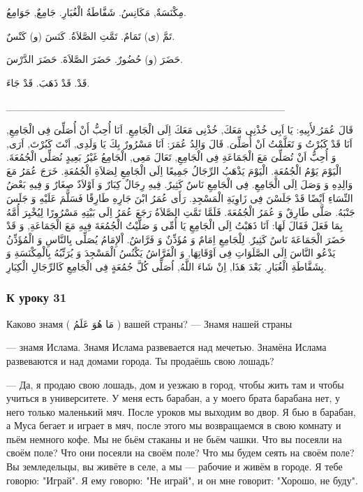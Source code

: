 \documentclass[a5paper]{article}
\begin{document}
مِكْنَسَةٌ, مَكَانِسُ. شَفَّاطَةُ الْغُبَارِ. جَامِعٌ, جَوَامِعُ. 

تَمَّ (ى) تَمَامٌ. تَمَّتِ الصَّلاَةُ. كَنَسَ (و) كَنْسٌ. 

حَضَرَ (و) حُضُورٌ. حَضَرَ الصَّلاَةَ. حَضَرَ الدَّرْسَ. 

قَدْ. قَدْ ذَهَبَ. قَدْ جَاءَ.

\_\_\_\_\_\_\_\_\_\_\_\_\_\_\_\_\_\_\_\_\_\_\_\_\_\_\_\_\_\_\_\_\_\_\_\_\_\_

قَالَ عُمَرُ ِلأَبِيهِ: يَا اَبِى خُذْنِى مَعَكَ, خُذْنِى مَعَكَ اِلَى الْجَامِعِ. اَنَا أُحِبُّ أَنْ أُصَلِّىَ فِى الْجَامِعِ, اَنَا قَدْ كَبُرْتُ وَ تَعَلَّمْتُ اَنْ أُصَلِّىَ. قَالَ وَالِدُ عُمَرَ: اَنَا مَسْرُورٌ بِكَ يَا وَلَدِى, اَنْتَ كَبُرْتَ, اَرَى, وَ أُحِبُّ اَنْ تُصَلِّىَ مَعَ الْجَمَاعَةِ فِى الْجَامِعِ, تَعَالَ مَعِى, الْجَامِعُ غَيْرُ بَعِيدٍ نُصَلِّى الْجُمُعَةَ. الْيَوْمَ يَوْمُ الْجُمُعَةِ. الْيَوْمَ يَذْهَبُ الرِّجَالُ جَمِيعًا اِلَى الْجَامِعِ لِصَلاَةِ الْجُمُعَةِ. خَرَجَ عُمَرُ مَعَ وَالِدِهِ وَ وَصَلَ اِلَى الْجَامِعِ. فِى الْجَامِعِ نَاسٌ كَثِيرٌ. فِيهِ رِجَالٌ كِبَارٌ وَ اَوْلاَدٌ صِغَارٌ وَ فِيهِ بَعْضُ النِّسَاءِ اَيْضًا قَدْ جَلَسْنَ فِى زَاوِيَةِ الْمَسْجِدِ. رَأَى عُمَرُ ابْنَ جَارِهِ طَارِقًا فَسَلَّمَ عَلَيْهِ وَ جَلَسَ جَنْبَهُ. صَلَّى طَارِقٌ وَ عُمَرُ الْجُمُعَةَ. فَلَمَّا تَمَّتِ الصَّلاَةُ رَجَعَ عُمَرُ اِلَى بَيْتِهِ مَسْرُورًا لِيُخْبِرَ أُمَّهُ بِمَا فَعَلَ فَقَالَ لَهَا: اَنَا ذَهَبْتُ اِلَى الْجَامِعِ يَا أُمِّى وَ صَلَّيْتُ الْجُمُعَةَ فِيهِ مَعَ الْجَمَاعَةِ, وَ قَدْ حَضَرَ الْجَمَاعَةَ نَاسٌ كَثِيرٌ. لِلْجَامِعِ اِمَامٌ وَ مُؤَذِّنٌ وَ فَرَّاشٌ. اْلإِمَامُ يُصَلِّى بِالنَّاسِ وَ الْمُؤَذِّنُ يَدْعُو النَّاسَ اِلَى الصَّلَوَاتِ فِى اَوْقَاتِهَا, وَ الْفَرَّاشُ يَكْنُسُ الْمَسْجِدَ وَ يُرَتِّبُهُ بِالْمِكْنَسَةِ وَ بِشَفَّاطَةِ الْغُبَارِ. بَعْدَ هَذَا, اِنْ شَاءَ اللَّهُ, اُصَلِّى كُلَّ جُمُعَةٍ فِى الْجَامِعِ كَالرِّجَالِ الْكِبَارِ.

\subsubsection[К уроку 31]{К уроку 31}
Каково знамя ( مَا هُوَ عَلَمُ ) вашей страны? — Знамя нашей страны

— знамя Ислама. Знамя Ислама развевается над мечетью. Знамёна Ислама развеваются и над домами города. Ты продаёшь свою лошадь?

— Да, я продаю свою лошадь, дом и уезжаю в город, чтобы жить там и чтобы учиться в университете. У меня есть барабан, а у моего брата барабана нет, у него только маленький мяч. После уроков мы выходим во двор. Я бью в барабан, а Муса бегает и играет в мяч, после этого мы возвращаемся в свою комнату и пьём немного кофе. Мы не бьём стаканы и не бьём чашки. Что вы посеяли на своём поле? Что они посеяли на своём поле? Что мы будем сеять на своём поле? Вы земледельцы, вы живёте в селе, а мы — рабочие и живём в городе. Я тебе говорю: "Играй". Я ему говорю: "Не играй", и он мне говорит: "Хорошо, не буду".
\end{document}
